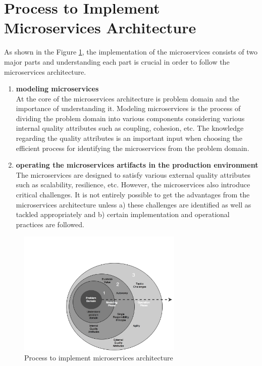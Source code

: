 \section{Process to Implement Microservices Architecture}\label{section:guidelines/process_to_microservices}
As shown in the Figure \ref{fig:guidelines/chapter_nine_process}, the implementation of the microservices consists of two major parts and understanding each part is crucial in order to follow the microservices architecture.
\begin{enumerate}
\item \textbf{modeling microservices} \\
At the core of the microservices architecture is problem domain and the importance of understanding it. Modeling microservices is the process of dividing the problem domain into various components considering various internal quality attributes such as coupling, cohesion, etc. The knowledge regarding the quality attributes is an important input when choosing the efficient process for identifying the microservices from the problem domain.
\item \textbf{operating the microservices artifacts in the production environment} \\
The microservices are designed to satisfy various external quality attributes such as scalability, resilience, etc. However, the microservices also introduce critical challenges. It is not entirely possible to get the advantages from the microservices architecture unless a) these challenges are identified as well as tackled appropriately and b) certain implementation and operational practices are followed.
\end{enumerate}
\begin{figure}[H]
\begin{center}
\includegraphics[width=0.7\textwidth]{figures/chapter_nine_process}
\caption{Process to implement microservices architecture}
\label{fig:guidelines/chapter_nine_process}
\end{center}
\end{figure}
